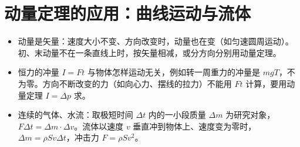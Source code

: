 \documentclass[\gkver]{gaokaozhenti}
\begin{document}
\section{动量定理的应用：曲线运动与流体}
\begin{yaodian}
\begin{itemize}
\item 动量是矢量：速度大小不变、方向改变时，动量也在变（如匀速圆周运动）。初、末动量不在一条直线上时，按矢量相减，或分方向分别用动量定理。
\item 恒力的冲量 $I=Ft$ 与物体怎样运动无关，例如转一周重力的冲量是 $mgT$，不为零。方向不断改变的力（如向心力、摆线的拉力）不能用 $Ft$ 计算，要用动量定理 $I=\Delta p$ 求。
\item 连续的气体、水流：取极短时间 $\Delta t$ 内的一小段质量 $\Delta m$ 为研究对象，$F\Delta t=\Delta m\cdot\Delta v$。流体以速度 $v$ 垂直冲到物体上、速度变为零时，$\Delta m=\rho Sv\Delta t$，冲击力 $F=\rho Sv^{2}$。
\end{itemize}
\end{yaodian}
\end{document}
